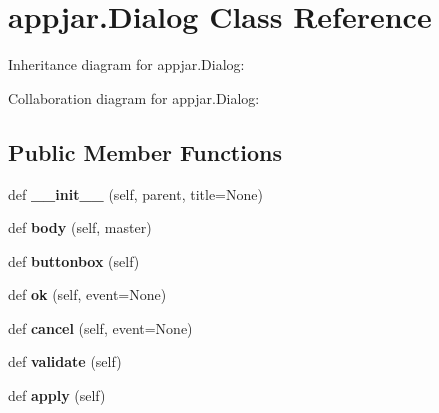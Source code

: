 \hypertarget{classappjar_1_1_dialog}{}\section{appjar.\+Dialog Class Reference}
\label{classappjar_1_1_dialog}


Inheritance diagram for appjar.\+Dialog\+:


Collaboration diagram for appjar.\+Dialog\+:
\subsection*{Public Member Functions}
\begin{DoxyCompactItemize}
\item 
\mbox{\label{classappjar_1_1_dialog_a84e39496688c27a2f306190ac2f0b379}} 
def {\bfseries \+\_\+\+\_\+init\+\_\+\+\_\+} (self, parent, title=None)
\item 
\mbox{\label{classappjar_1_1_dialog_a1dea8a822f44566eb4c0eaef03b787c7}} 
def {\bfseries body} (self, master)
\item 
\mbox{\label{classappjar_1_1_dialog_a306392c6735314ae66672e264536abcc}} 
def {\bfseries buttonbox} (self)
\item 
\mbox{\label{classappjar_1_1_dialog_a351a82acef4b8ac6cdee12631d0ae71b}} 
def {\bfseries ok} (self, event=None)
\item 
\mbox{\label{classappjar_1_1_dialog_a38243e446fe8173d53bf09294b152608}} 
def {\bfseries cancel} (self, event=None)
\item 
\mbox{\label{classappjar_1_1_dialog_af80d3d038114405c908e7ef39522b3d8}} 
def {\bfseries validate} (self)
\item 
\mbox{\label{classappjar_1_1_dialog_ab78b5ab95773b774dc8e69f75dde02f1}} 
def {\bfseries apply} (self)
\end{DoxyCompactItemize}
